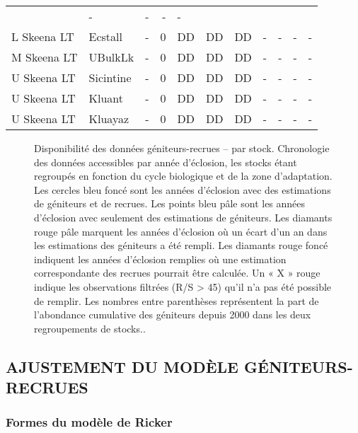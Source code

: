 \documentclass[french,11pt]{book}
\begin{document}
\begin{longtable}[t]{llrrlllrrrr}
& - & - & - & -\\ L Skeena LT & Ecstall & - & 0 & DD & DD & DD & - & - & - & -\\ M Skeena LT & UBulkLk & - & 0 & DD & DD & DD & - & - & - & -\\ U Skeena LT & Sicintine & - & 0 & DD & DD & DD & - & - & - & -\\ U Skeena LT & Kluant & - & 0 & DD & DD & DD & - & - & - & -\\ U Skeena LT & Kluayaz & - & 0 & DD & DD & DD & - & - & - & -\\* \end{longtable}

\endgroup{} \endgroup{}

\clearpage


\begin{figure}[htb]

{\centering {} 

}

\caption{Disponibilité des données géniteurs-recrues -- par stock. Chronologie des données accessibles par année d'éclosion, les stocks étant regroupés en fonction du cycle biologique et de la zone d'adaptation. Les cercles bleu foncé sont les années d'éclosion avec des estimations de géniteurs et de recrues. Les points bleu pâle sont les années d'éclosion avec seulement des estimations de géniteurs. Les diamants rouge pâle marquent les années d'éclosion où un écart d'un an dans les estimations des géniteurs a été rempli. Les diamants rouge foncé indiquent les années d'éclosion remplies où une estimation correspondante des recrues pourrait être calculée. Un « X » rouge indique les observations filtrées (R/S \textgreater{} 45) qu'il n'a pas été possible de remplir. Les nombres entre parenthèses représentent la part de l'abondance cumulative des géniteurs depuis 2000 dans les deux regroupements de stocks..}\label{fig:SRDataOverview}
\end{figure}
\clearpage

\subsection{AJUSTEMENT DU MODÈLE GÉNITEURS-RECRUES}\label{SRFitting}

\subsubsection{Formes du modèle de Ricker}\label{ModelForms}
\end{document}

